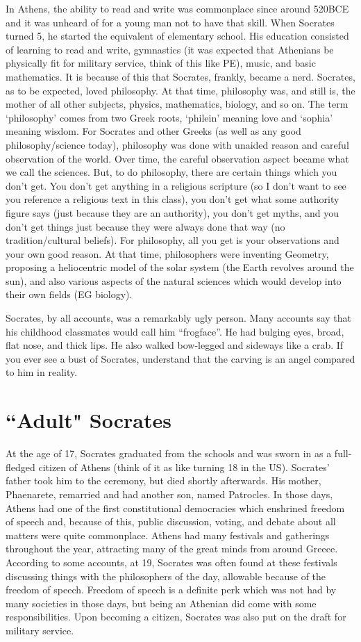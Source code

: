 In Athens, the ability to read and write was commonplace since around 520BCE and it was unheard of for a young man not to have that skill. When Socrates turned 5, he started the equivalent of elementary school. His education consisted of learning to read and write, gymnastics (it was expected that Athenians be physically fit for military service, think of this like PE), music, and basic mathematics. It is because of this that Socrates, frankly, became a nerd. Socrates, as to be expected, loved philosophy. At that time, philosophy was, and still is, the mother of all other subjects, physics, mathematics, biology, and so on. The term `philosophy' comes from two Greek roots, `philein' meaning love and `sophia' meaning wisdom. For Socrates and other Greeks (as well as any good philosophy/science today), philosophy was done with unaided reason and careful observation of the world. Over time, the careful observation aspect became what we call the sciences. But, to do philosophy, there are certain things which you don't get. You don't get anything in a religious scripture (so I don't want to see you reference a religious text in this class), you don't get what some authority figure says (just because they are an authority), you don't get myths, and you don't get things just because they were always done that way (no tradition/cultural beliefs). For philosophy, all you get is your observations and your own good reason. At that time, philosophers were inventing Geometry, proposing a heliocentric model of the solar system (the Earth revolves around the sun), and also various aspects of the natural sciences which would develop into their own fields (EG biology).

Socrates, by all accounts, was a remarkably ugly person. Many accounts say that his childhood classmates would call him “frogface”. He had bulging eyes, broad, flat nose, and thick lips. He also walked bow-legged and sideways like a crab. If you ever see a bust of Socrates, understand that the carving is an angel compared to him in reality.
\section{“Adult" Socrates}

At the age of 17, Socrates graduated from the schools and was sworn in as a full-fledged citizen of Athens (think of it as like turning 18 in the US). Socrates' father took him to the ceremony, but died shortly afterwards. His mother, Phaenarete, remarried and had another son, named Patrocles.  In those days, Athens had one of the first constitutional democracies which enshrined freedom of speech and, because of this, public discussion, voting, and debate about all matters were quite commonplace. Athens had many festivals and gatherings throughout the year, attracting many of the great minds from around Greece. According to some accounts, at 19, Socrates was often found at these festivals discussing things with the philosophers of the day, allowable because of the freedom of speech. Freedom of speech is a definite perk which was not had by many societies in those days, but being an Athenian did come with some responsibilities. Upon becoming a citizen, Socrates was also put on the draft for military service.
